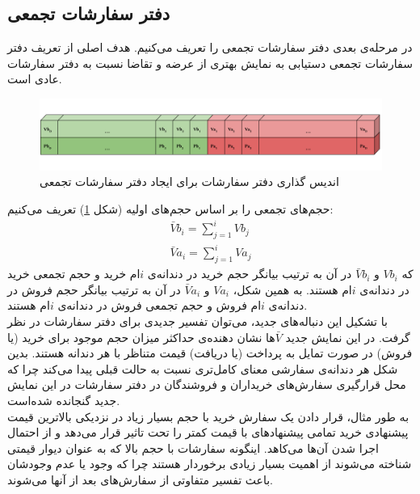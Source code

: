 \subsection{دفتر سفارشات تجمعی}
در مرحله‌ی بعدی دفتر سفارشات تجمعی را تعریف می‌کنیم. هدف‌ اصلی از تعریف دفتر سفارشات تجمعی دستیابی به نمایش بهتری از عرضه و تقاضا نسبت به دفتر سفارشات عادی است\cite{blazejewski2004application}.\\
\begin{figure}[!t]
	\includegraphics[width=1 \textwidth]{images/orderbook_t1}
	\centering
	\caption{اندیس گذاری دفتر سفارشات برای ایجاد دفتر سفارشات تجمعی	}
	\label{fig.orderbook_t1}
\end{figure}
حجم‌های تجمعی را بر اساس حجم‌های اولیه (شکل \ref{fig.orderbook_t1}) تعریف می‌کنیم:
\begin{equation}
	\begin{aligned}
			\bar{V}b_i = \sum_{j=1}^{i} Vb_j\\
			\bar{V}a_i = \sum_{j=1}^{i} Va_j
	\end{aligned}
\end{equation}
که $Vb_i$ و $\bar{V}b_i$ در آن به ترتیب بیانگر حجم خرید در دندانه‌ی $i$ام خرید و حجم تجمعی خرید در دندانه‌ی $i$ام هستند. به همین شکل، $Va_i$ و $\bar{V}a_i$ در آن به ترتیب بیانگر حجم فروش در دندانه‌ی $i$ام فروش و حجم تجمعی فروش در دندانه‌ی $i$ام هستند.\\
با تشکیل این دنباله‌های جدید، می‌توان تفسیر جدیدی برای دفتر سفارشات در نظر گرفت. در این نمایش جدید $\bar{V}$ها نشان دهنده‌ی حداکثر میزان حجم موجود برای خرید (یا فروش) در صورت تمایل به پرداخت (یا دریافت) قیمت متناظر با هر دندانه‌ هستند. بدین شکل هر دندانه‌ی سفارشی معنا‌ی کامل‌تری نسبت به حالت قبلی پیدا می‌کند چرا که محل قرارگیری سفارش‌های خریداران و فروشندگان در دفتر سفارشات در این نمایش جدید گنجانده شده‌است.\\
به طور مثال، قرار دادن یک سفارش خرید با حجم بسیار زیاد در نزدیکی بالاترین قیمت پیشنهادی خرید تمامی پیشنهادهای با قیمت کمتر را تحت تاثیر قرار می‌دهد و از احتمال اجرا شدن آن‌ها می‌کاهد. اینگونه سفارشات با حجم بالا که به عنوان دیوار قیمتی شناخته می‌شوند از اهمیت بسیار زیادی برخوردار هستند چرا که وجود یا عدم وجودشان باعث تفسیر متفاوتی از سفارش‌های بعد از آنها می‌شوند.
